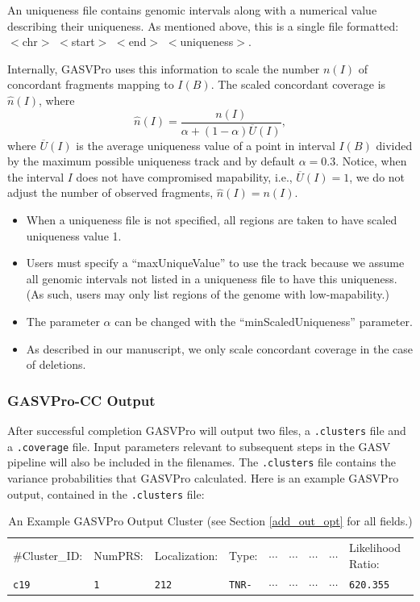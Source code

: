 \documentclass[11pt]{article}
\begin{document}
An uniqueness file contains genomic intervals along with a numerical value describing their uniqueness. As mentioned above, this is a single file formatted: $<$chr$>$ $<$start$>$ $<$end$>$ $<$uniqueness$>$. 

Internally, GASVPro uses this information to scale the number $n(I)$ of concordant fragments mapping to $I(B)$. The scaled  concordant coverage is $\hat{n}(I)$, where
\begin{equation}
\hat{n}(I)= \frac{n(I)}{\alpha + (1-\alpha) \overline{U}(I)},
\end{equation}
\noindent where $\overline{U}(I)$ is the average uniqueness value of a point in interval $I(B)$ divided by the maximum possible uniqueness track and by default  $\alpha = 0.3$. Notice, when the interval $I$ does not have compromised mapability, i.e., $\overline{U}(I) = 1$, we do not adjust the number of observed fragments, $\hat{n}(I) = n(I)$.

\begin{itemize}
\item When a uniqueness file is not specified, all regions are taken to have scaled uniqueness value 1.
\item Users must specify a ``maxUniqueValue'' to use the track because we assume all genomic intervals not listed in a uniqueness file to have this uniqueness. (As such, users may only list regions of the genome with low-mapability.)
\item The parameter $\alpha$ can be changed with the ``minScaledUniqueness'' parameter.
\item As described in our manuscript, we only scale concordant coverage in the case of deletions.  
\end{itemize}


\subsubsection{GASVPro-CC Output}
After successful completion GASVPro will output two files, a \verb+.clusters+ file and a \verb+.coverage+ file. Input parameters relevant to subsequent steps in the GASV pipeline will also be included in the filenames. The \verb+.clusters+ file contains the variance probabilities that GASVPro calculated. Here is an example GASVPro output, contained in the \verb+.clusters+ file:
\begin{table}[h]\small
   \centering
   \begin{tabular}{lllllllll} %
 \#Cluster\_ID:  &  NumPRS:   &  Localization: & Type:  &  $\cdots$    &     $\cdots$  & $\cdots$  &  $\cdots$ & Likelihood Ratio:\\
		\verb+c19+  &  \verb+1+  &    \verb+212+   &    \verb+TNR-+     & $\cdots$   &    $\cdots$  &     $\cdots$&    $\cdots$ & \verb+620.355+
    \end{tabular}
   \caption{An Example GASVPro Output Cluster (see Section \ref{add_out_opt} for all fields.)}
   \label{tab:booktabs}
\end{table}
\end{document}
